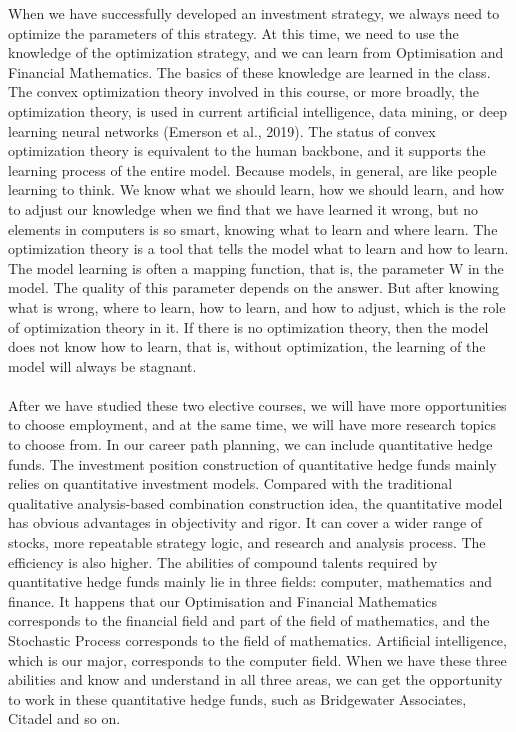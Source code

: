 \documentclass{article}
\begin{document}
    When we have successfully developed an investment strategy, we always need to optimize the parameters of this strategy. At this time, we need to use the knowledge of the optimization strategy, and we can learn from Optimisation and Financial Mathematics. The basics of these knowledge are learned in the class. The convex optimization theory involved in this course, or more broadly, the optimization theory, is used in current artificial intelligence, data mining, or deep learning neural networks (Emerson et al., 2019). The status of convex optimization theory is equivalent to the human backbone, and it supports the learning process of the entire model. Because models, in general, are like people learning to think. We know what we should learn, how we should learn, and how to adjust our knowledge when we find that we have learned it wrong, but no elements in computers is so smart, knowing what to learn and where learn. The optimization theory is a tool that tells the model what to learn and how to learn. The model learning is often a mapping function, that is, the parameter W in the model. The quality of this parameter depends on the answer. But after knowing what is wrong, where to learn, how to learn, and how to adjust, which is the role of optimization theory in it. If there is no optimization theory, then the model does not know how to learn, that is, without optimization, the learning of the model will always be stagnant.\\
    \\
    After we have studied these two elective courses, we will have more opportunities to choose employment, and at the same time, we will have more research topics to choose from. In our career path planning, we can include quantitative hedge funds. The investment position construction of quantitative hedge funds mainly relies on quantitative investment models. Compared with the traditional qualitative analysis-based combination construction idea, the quantitative model has obvious advantages in objectivity and rigor. It can cover a wider range of stocks, more repeatable strategy logic, and research and analysis process. The efficiency is also higher. The abilities of compound talents required by quantitative hedge funds mainly lie in three fields: computer, mathematics and finance. It happens that our Optimisation and Financial Mathematics corresponds to the financial field and part of the field of mathematics, and the Stochastic Process corresponds to the field of mathematics. Artificial intelligence, which is our major, corresponds to the computer field. When we have these three abilities and know and understand in all three areas, we can get the opportunity to work in these quantitative hedge funds, such as Bridgewater Associates, Citadel and so on.\\
\end{document}
